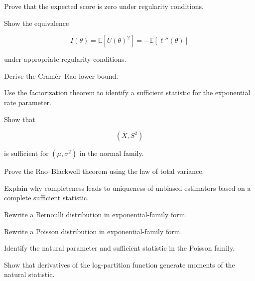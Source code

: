 \begin{exercise}[3]
Prove that the expected score is zero under regularity conditions.
\end{exercise}

\begin{exercise}[3]
Show the equivalence

\[
I(\theta)
=
\mathbb{E}[U(\theta)^2]
=
-
\mathbb{E}[\ell''(\theta)]
\]

under appropriate regularity conditions.
\end{exercise}

\begin{exercise}[3]
Derive the Cramér--Rao lower bound.
\end{exercise}

\begin{exercise}[3]
Use the factorization theorem to identify a sufficient statistic for the
exponential rate parameter.
\end{exercise}

\begin{exercise}[3]
Show that

\[
(
\overline{X},S^2
)
\]

is sufficient for \((\mu,\sigma^2)\) in the normal family.
\end{exercise}

\begin{exercise}[3]
Prove the Rao--Blackwell theorem using the law of total variance.
\end{exercise}

\begin{exercise}[3]
Explain why completeness leads to uniqueness of unbiased estimators based
on a complete sufficient statistic.
\end{exercise}

\begin{exercise}[3]
Rewrite a Bernoulli distribution in exponential-family form.
\end{exercise}

\begin{exercise}[3]
Rewrite a Poisson distribution in exponential-family form.
\end{exercise}

\begin{exercise}[3]
Identify the natural parameter and sufficient statistic in the Poisson
family.
\end{exercise}

\begin{exercise}[3]
Show that derivatives of the log-partition function generate moments of
the natural statistic.
\end{exercise}

